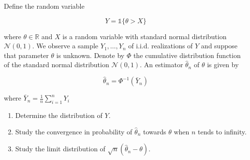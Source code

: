 \begin{Exercise}
  Define the random variable

  $$
    Y=\mathbb{1}\{\theta>X\}
  $$

  where $\theta \in \mathbb{R}$ and $X$ is a random variable with standard normal
  distribution $\mathcal{N}(0,1)$. We observe a sample $Y_{1}, \ldots, Y_{n}$ of
  i.i.d. realizations of $Y$ and suppose that parameter $\theta$ is unknown.
  Denote by $\Phi$ the cumulative distribution function of the standard normal
  distribution $\mathcal{N}(0,1)$. An estimator $\hat{\theta}_{n}$ of $\theta$ is
  given by

  $$
    \hat{\theta}_{n}=\Phi^{-1}\left(\bar{Y}_{n}\right)
  $$

  where $\bar{Y}_{n}=\frac{1}{n} \sum_{i=1}^{n} Y_{i}$

  \begin{enumerate}
    \item Determine the distribution of $Y$.

    \item Study the convergence in probability of $\hat{\theta}_{n}$ towards $\theta$
          when $n$ tends to infinity.

    \item Study the limit distribution of $\sqrt{n}\left(\hat{\theta}_{n}-\theta\right)$.

  \end{enumerate}
\end{Exercise}

